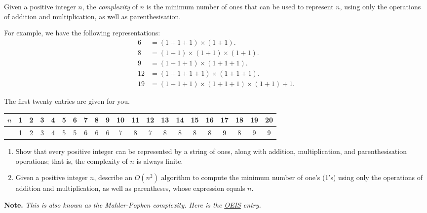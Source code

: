\documentclass{article}
\begin{document}
\begin{question}
Given a positive integer $n$, the {\em complexity} of $n$ is the minimum number of ones that can be used to represent $n$, using only the operations of addition and multiplication, as well as parenthesisation.

For example, we have the following representations:
\begin{align*}
    6 &= (1 + 1 + 1) \times (1 + 1). \\
    8 &= (1 + 1) \times (1 + 1) \times (1 + 1). \\
    9 &= (1 + 1 + 1) \times (1 + 1 + 1). \\
    12 &= (1 + 1 + 1 + 1) \times (1 + 1 + 1). \\
    19 &= (1 + 1 + 1) \times (1 + 1 + 1) \times (1 + 1) + 1.
\end{align*}

The first twenty entries are given for you.
\begin{center}
    \begin{tabular}{c|cccccccccccccccccccc}
        $n$ & 1 & 2 & 3 & 4 & 5 & 6 & 7 & 8 & 9 & 10 & 11 & 12 & 13 & 14 & 15 & 16 & 17 & 18 & 19 & 20 \\
        \hline & 1 & 2 & 3 & 4 & 5 & 5 & 6 & 6 & 6 & 7 & 8 & 7 & 8 & 8 & 8 & 8 & 9 & 8 & 9 & 9
    \end{tabular}
\end{center}

\begin{enumerate}[label = (\alph*)]
    \item Show that every positive integer can be represented by a string of ones, along with addition, multiplication, and parenthesisation operations; that is, the complexity of $n$ is always finite.

    \item Given a positive integer $n$, describe an $O(n^2)$ algorithm to compute the minimum number of one's (1's) using only the operations of addition and multiplication, as well as parentheses, whose expression equals $n$.
\end{enumerate}

{\bfseries Note.} {\em This is also known as the Mahler-Popken complexity. Here is the \href{https://oeis.org/A005245}{OEIS} entry.}
\end{question}
\end{document}
